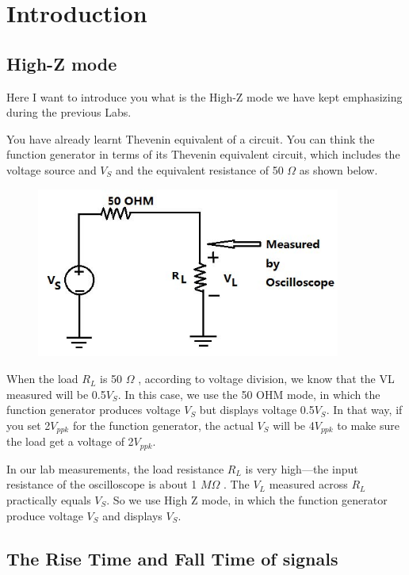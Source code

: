 \documentclass{article}
\begin{document}
\section{Introduction}

\subsection{High-Z mode}
Here I want to introduce you what is the High-Z mode we have kept emphasizing
during the previous Labs.

You have already learnt Thevenin equivalent of a circuit. You can think the
function generator in terms of its Thevenin equivalent circuit, which includes the
voltage source and $V_S$ and the equivalent resistance of 50 $\Omega$ as shown below.

\begin{figure}[!h]
	\centering
	\includegraphics[width=10cm]{p1.jpg}
	\label{fig-1}
\end{figure}

When the load $R_L$ is 50 $\Omega$ , according to voltage division, we know that the VL
measured will be 0.5$V_S$. In this case, we use the 50 OHM mode, in which the
function generator produces voltage $V_S$ but displays voltage 0.5$V_S$. In that way, if
you set 2$V_{ppk}$ for the function generator, the actual $V_S$ will be 4$V_{ppk}$ to make sure
the load get a voltage of 2$V_{ppk}$.

In our lab measurements, the load resistance $R_L$ is very high—the input resistance
of the oscilloscope is about 1 $M\Omega$ . The $V_L$ measured across $R_L$ practically equals
$V_S$. So we use High Z mode, in which the function generator produce voltage $V_S$
and displays $V_S$.

\subsection{The Rise Time and Fall Time of signals}
\end{document}
